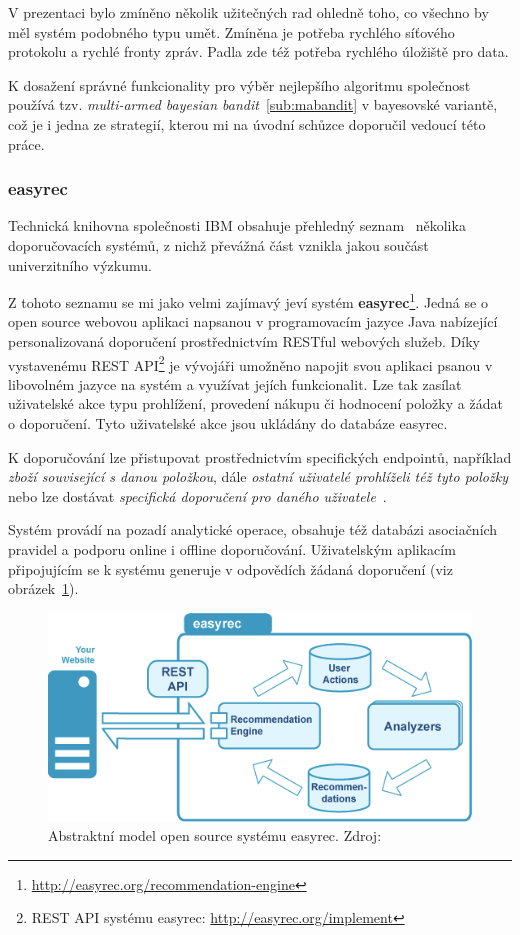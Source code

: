 \documentclass[thesis=M,czech]{FITthesis}[2014/05/07]
\begin{document}
V prezentaci bylo zmíněno několik užitečných rad ohledně toho, co všechno by měl systém podobného typu umět. Zmíněna je potřeba rychlého síťového protokolu a rychlé fronty zpráv. Padla zde též potřeba rychlého úložiště pro data.

K dosažení správné funkcionality pro výběr nejlepšího algoritmu společnost používá tzv. \emph{multi-armed bayesian bandit}~\ref{sub:mabandit} v bayesovské variantě, což je i jedna ze strategií, kterou mi na úvodní schůzce doporučil vedoucí této práce.

\subsubsection{easyrec}
Technická knihovna společnosti IBM obsahuje přehledný seznam~\cite{ibm} několika doporučovacích systémů, z nichž převážná část vznikla jakou součást univerzitního výzkumu.

Z tohoto seznamu se mi jako velmi zajímavý jeví systém \textbf{easyrec}\footnote{\url{http://easyrec.org/recommendation-engine}}. Jedná se o open source webovou aplikaci napsanou v programovacím jazyce Java nabízející personalizovaná doporučení prostřednictvím RESTful webových služeb. Díky vystavenému REST API\footnote{REST API systému easyrec: \url{http://easyrec.org/implement}} je vývojáři umožněno napojit svou aplikaci psanou v libovolném jazyce na systém a využívat jejích funkcionalit. Lze tak zasílat uživatelské akce typu prohlížení, provedení nákupu či hodnocení položky a žádat o doporučení. Tyto uživatelské akce jsou ukládány do databáze easyrec.

K doporučování lze přistupovat prostřednictvím specifických endpointů, například \emph{zboží související s danou položkou}, dále \emph{ostatní uživatelé prohlíželi též tyto položky} nebo lze dostávat \emph{specifická doporučení pro daného uživatele}~\cite{ibm}. 

Systém provádí na pozadí analytické operace, obsahuje též databázi asociačních pravidel a podporu online i offline doporučování. Uživatelským aplikacím připojujícím se k systému generuje v odpovědích žádaná doporučení (viz obrázek~\ref{fig:easyrec}).

\begin{figure}\centering
	\includegraphics[width=1.0\textwidth]{obr/easyrec.png}
 	\caption[Abstraktní model open source systému easyrec]{Abstraktní model open source systému easyrec. Zdroj: \cite{easyrec}}\label{fig:easyrec}
\end{figure}	
\end{document}
